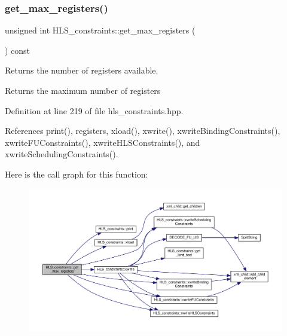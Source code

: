 \subsubsection{\texorpdfstring{get\+\_\+max\+\_\+registers()}{get\_max\_registers()}}
{\footnotesize\ttfamily unsigned int H\+L\+S\+\_\+constraints\+::get\+\_\+max\+\_\+registers (\begin{DoxyParamCaption}{ }\end{DoxyParamCaption}) const\hspace{0.3cm}{\ttfamily [inline]}}



Returns the number of registers available. 

\begin{DoxyReturn}{Returns}
the maximum number of registers 
\end{DoxyReturn}


Definition at line 219 of file hls\+\_\+constraints.\+hpp.



References print(), registers, xload(), xwrite(), xwrite\+Binding\+Constraints(), xwrite\+F\+U\+Constraints(), xwrite\+H\+L\+S\+Constraints(), and xwrite\+Scheduling\+Constraints().

Here is the call graph for this function\+:
\nopagebreak
\begin{figure}[H]
\begin{center}
\leavevmode
\includegraphics[width=350pt]{dd/d96/classHLS__constraints_a4378dfa86b2203804067e93694ebaa6a_cgraph}
\end{center}
\end{figure}
\mbox{\label{classHLS__constraints_a5ffda80abbda1488aaacca937993df74}} 
